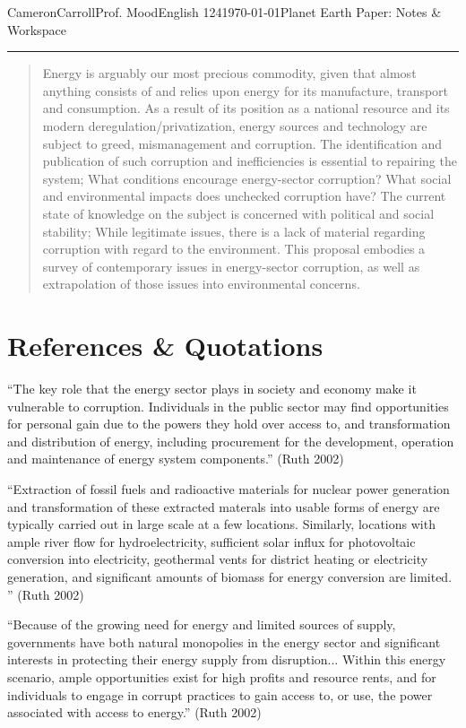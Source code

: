 \documentclass[12pt,letterpaper]{article}
\begin{document}
\begin{mla}{Cameron}{Carroll}{Prof. Mood}{English 124}{\today}{Planet Earth Paper: Notes \& Workspace}
\vspace{0.5cm}
\hrule
\vspace{0.5cm}
\singlespacing

\begin{abstract}
Energy is arguably our most precious commodity, given that almost anything consists of and relies upon energy for its manufacture, transport and consumption. As a result of its position as a national resource and its modern deregulation/privatization, energy sources and technology are subject to greed, mismanagement and corruption. The identification and publication of such corruption and inefficiencies is essential to repairing the system; What conditions encourage energy-sector corruption? What social and environmental impacts does unchecked corruption have? The current state of knowledge on the subject is concerned with political and social stability; While legitimate issues, there is a lack of material regarding corruption with regard to the environment. This proposal embodies a survey of contemporary issues in energy-sector corruption, as well as extrapolation of those issues into environmental concerns.
\end{abstract}

\section*{References \& Quotations}
``The key role that the energy sector plays in society and economy make it vulnerable to corruption. Individuals in the public sector may find opportunities for personal gain due to the powers they hold over access to, and transformation and distribution of energy, including procurement for the development, operation and maintenance of energy system components.'' (Ruth 2002)

``Extraction of fossil fuels and radioactive materials for nuclear power generation and transformation of these extracted materals into usable forms of energy are typically carried out in large scale at a few locations. Similarly, locations with ample river flow for hydroelectricity, sufficient solar influx for photovoltaic conversion into electricity, geothermal vents for district heating or electricity generation, and significant amounts of biomass for energy conversion are limited. '' (Ruth 2002)

``Because of the growing need for energy and limited sources of supply, governments have both natural monopolies in the energy sector and significant interests in protecting their energy supply from disruption... Within this energy scenario, ample opportunities exist for high profits and resource rents, and for individuals to engage in corrupt practices to gain access to, or use, the power associated with access to energy.'' (Ruth 2002)


\end{mla}
\end{document}
